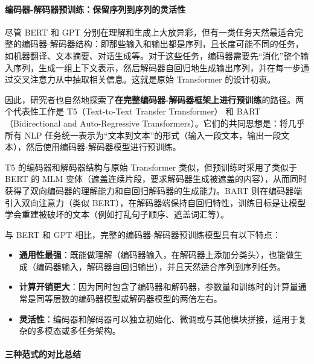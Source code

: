 \paragraph{编码器-解码器预训练：保留序列到序列的灵活性}

尽管 BERT 和 GPT 分别在理解和生成上大放异彩，但有一类任务天然最适合完整的编码器-解码器结构：即那些输入和输出都是序列，且长度可能不同的任务，如机器翻译、文本摘要、对话生成等。对于这些任务，编码器需要先“消化”整个输入序列，生成一组上下文表示，然后解码器自回归地生成输出序列，并在每一步通过交叉注意力从中抽取相关信息。这就是原始 Transformer 的设计初衷。

因此，研究者也自然地探索了\textbf{在完整编码器-解码器框架上进行预训练}的路径。两个代表性工作是 T5（Text-to-Text Transfer Transformer）\cite{raffel2023exploringlimitstransferlearning} 和 BART（Bidirectional and Auto-Regressive Transformers）\cite{lewis2019bartdenoisingsequencetosequencepretraining}。它们的共同思想是：将几乎所有 NLP 任务统一表示为“文本到文本”的形式（输入一段文本，输出一段文本），然后使用编码器-解码器模型进行预训练。

T5 的编码器和解码器结构与原始 Transformer 类似，但预训练时采用了类似于 BERT 的 MLM 变体（遮盖连续片段，要求解码器生成被遮盖的内容），从而同时获得了双向编码器的理解能力和自回归解码器的生成能力。BART 则在编码器端引入双向注意力（类似 BERT），在解码器端保持自回归特性，训练目标是让模型学会重建被破坏的文本（例如打乱句子顺序、遮盖词汇等）。

与 BERT 和 GPT 相比，完整的编码器-解码器预训练模型具有以下特点：
\begin{itemize}
    \item \textbf{通用性最强}：既能做理解（编码器输入，在解码器上添加分类头），也能做生成（编码器输入，解码器自回归输出），并且天然适合序列到序列任务。
    \item \textbf{计算开销更大}：因为同时包含了编码器和解码器，参数量和训练时的计算量通常是同等层数的编码器模型或解码器模型的两倍左右。
    \item \textbf{灵活性}：编码器和解码器可以独立初始化、微调或与其他模块拼接，适用于复杂的多模态或多任务架构。
\end{itemize}

\paragraph{三种范式的对比总结}

